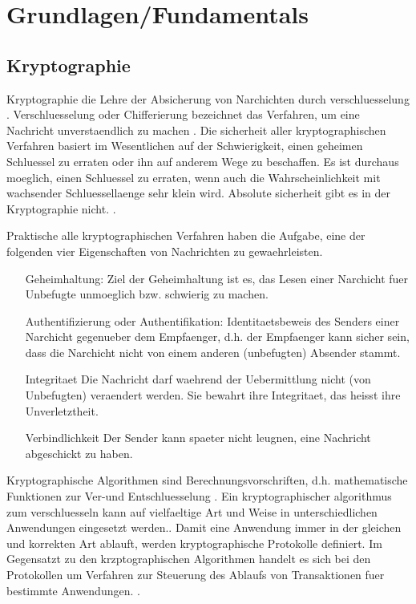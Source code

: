 \chapter{Grundlagen/Fundamentals}
\section{Kryptographie}

Kryptographie die Lehre der Absicherung von Narchichten durch verschluesselung \cite[18]{crypto}.
Verschluesselung oder Chifferierung bezeichnet das Verfahren, um eine Nachricht unverstaendlich zu machen \cite[18]{crypto}.
Die sicherheit aller kryptographischen Verfahren basiert im Wesentlichen auf der Schwierigkeit, einen geheimen Schluessel zu erraten oder ihn auf anderem Wege zu beschaffen.
Es ist durchaus moeglich, einen Schluessel zu erraten, wenn auch die Wahrscheinlichkeit mit wachsender Schluessellaenge sehr klein wird. Absolute sicherheit gibt es in der Kryptographie nicht.
\cite[25]{crypto}.

Praktische alle kryptographischen Verfahren haben die Aufgabe, eine der folgenden vier Eigenschaften von Nachrichten zu gewaehrleisten. \cite[18]{crypto}
\begin{itemize}
    \item[Geheimhaltung:] Ziel der Geheimhaltung ist es, das Lesen einer Narchicht fuer Unbefugte unmoeglich bzw. schwierig zu machen.
    \item[Authentifizierung] oder Authentifikation: Identitaetsbeweis des Senders einer Narchicht gegenueber dem Empfaenger, d.h. der Empfaenger kann sicher sein, dass die Narchicht nicht von einem anderen (unbefugten) Absender stammt.
    \item[Integritaet] Die Nachricht darf waehrend der Uebermittlung nicht (von Unbefugten) veraendert werden. Sie bewahrt ihre Integritaet, das heisst ihre Unverletztheit.
    \item[Verbindlichkeit] Der Sender kann spaeter nicht leugnen, eine Nachricht abgeschickt zu haben.
\end{itemize}

Kryptographische Algorithmen sind Berechnungsvorschriften, d.h. mathematische Funktionen zur Ver-und Entschluesselung \cite[19]{crypto}.
Ein kryptographischer algorithmus zum verschluesseln kann auf vielfaeltige Art und Weise in unterschiedlichen Anwendungen eingesetzt werden.\cite[22]{eg-spec}.
Damit eine Anwendung immer in der gleichen und korrekten
Art ablauft, werden kryptographische Protokolle definiert. Im Gegensatzt zu den krzptographischen Algorithmen handelt es sich bei den Protokollen um Verfahren zur Steuerung des Ablaufs von Transaktionen fuer bestimmte Anwendungen. \cite[22]{eg-spec}.

